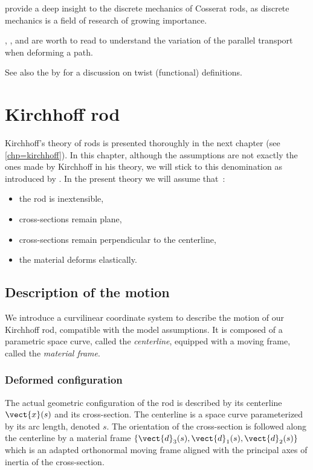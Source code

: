  provide a deep insight to the discrete mechanics of Cosserat rods, as discrete mechanics is a field of research of growing importance.

, ,  and  are worth to read to understand the variation of the parallel transport when deforming a path.

See also the  by  for a discussion on twist (functional) definitions.



\section{Kirchhoff rod}\label{sec=kirchhoff_rod}
Kirchhoff's theory of rods is presented thoroughly in the next chapter (see \cref{chp=kirchhoff}). In this chapter, although the assumptions are not exactly the ones made by  Kirchhoff in his theory, we will stick to this denomination as introduced by \cite{Bergou2008}. In the present theory we will assume that~:
\begin{itemize}
\item the rod is inextensible,
\item cross-sections remain plane,
\item cross-sections remain perpendicular to the centerline,
\item the material deforms elastically.
\end{itemize}

\subsection{Description of the motion}\label{sec=description_motion}
We introduce a curvilinear coordinate system to describe the motion of our Kirchhoff rod, compatible with the model assumptions. It is composed of a parametric space curve, called the \emph{centerline}, equipped with a moving frame, called the \emph{material frame}.

\subsubsection{Deformed configuration}
The actual geometric configuration of the rod is described by its centerline $\vect{x}(s)$ and its cross-section. The centerline is a space curve parameterized by its arc length, denoted $s$. The orientation of the cross-section is followed along the centerline by a material frame $\{\vect{d}_3 (s),\vect{d}_1 (s),\vect{d}_2 (s)\}$ which is an adapted orthonormal moving frame aligned with the principal axes of inertia of the cross-section.

